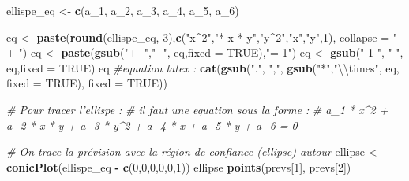 \documentclass[french]{article}
\newenvironment{Shaded}{\begin{snugshade}}{\end{snugshade}}
\newcommand{\CharTok}[1]{\textcolor[rgb]{0.31,0.60,0.02}{#1}}
\newcommand{\CommentTok}[1]{\textcolor[rgb]{0.56,0.35,0.01}{\textit{#1}}}
\newcommand{\DataTypeTok}[1]{\textcolor[rgb]{0.13,0.29,0.53}{#1}}
\newcommand{\DecValTok}[1]{\textcolor[rgb]{0.00,0.00,0.81}{#1}}
\newcommand{\KeywordTok}[1]{\textcolor[rgb]{0.13,0.29,0.53}{\textbf{#1}}}
\newcommand{\NormalTok}[1]{#1}
\newcommand{\OperatorTok}[1]{\textcolor[rgb]{0.81,0.36,0.00}{\textbf{#1}}}
\newcommand{\OtherTok}[1]{\textcolor[rgb]{0.56,0.35,0.01}{#1}}
\newcommand{\StringTok}[1]{\textcolor[rgb]{0.31,0.60,0.02}{#1}}
\begin{document}
\begin{Shaded}
\begin{Highlighting}[]
\NormalTok{ellispe_eq <-}\StringTok{ }\KeywordTok{c}\NormalTok{(a_}\DecValTok{1}\NormalTok{, a_}\DecValTok{2}\NormalTok{, a_}\DecValTok{3}\NormalTok{, a_}\DecValTok{4}\NormalTok{,}
\NormalTok{                a_}\DecValTok{5}\NormalTok{, a_}\DecValTok{6}\NormalTok{)}

\NormalTok{eq <-}\StringTok{ }\KeywordTok{paste}\NormalTok{(}\KeywordTok{round}\NormalTok{(ellispe_eq, }\DecValTok{3}\NormalTok{),}\KeywordTok{c}\NormalTok{(}\StringTok{"x^2"}\NormalTok{,}\StringTok{"* x * y"}\NormalTok{,}\StringTok{"y^2"}\NormalTok{,}\StringTok{"x"}\NormalTok{,}\StringTok{"y"}\NormalTok{,}\DecValTok{1}\NormalTok{),}
            \DataTypeTok{collapse =} \StringTok{" + "}\NormalTok{)}
\NormalTok{eq <-}\StringTok{ }\KeywordTok{paste}\NormalTok{(}\KeywordTok{gsub}\NormalTok{(}\StringTok{"+ -"}\NormalTok{,}\StringTok{"- "}\NormalTok{, eq,}\DataTypeTok{fixed =} \OtherTok{TRUE}\NormalTok{),}\StringTok{"= 1"}\NormalTok{)}
\NormalTok{eq <-}\StringTok{ }\KeywordTok{gsub}\NormalTok{(}\StringTok{" 1 "}\NormalTok{, }\StringTok{" "}\NormalTok{, eq,}\DataTypeTok{fixed =} \OtherTok{TRUE}\NormalTok{)}
\NormalTok{eq}
\CommentTok{#equation latex :}
\KeywordTok{cat}\NormalTok{(}\KeywordTok{gsub}\NormalTok{(}\StringTok{"."}\NormalTok{, }\StringTok{","}\NormalTok{,}
         \KeywordTok{gsub}\NormalTok{(}\StringTok{"*"}\NormalTok{,}\StringTok{"}\CharTok{\textbackslash{}\textbackslash{}}\StringTok{times"}\NormalTok{, eq, }\DataTypeTok{fixed =} \OtherTok{TRUE}\NormalTok{),}
         \DataTypeTok{fixed =} \OtherTok{TRUE}\NormalTok{))}

\CommentTok{# Pour tracer l'ellispe :}
\CommentTok{# il faut une equation sous la forme :}
\CommentTok{# a_1 * x^2 + a_2 * x * y + a_3 * y^2 + a_4 * x + a_5 * y + a_6 = 0}

\CommentTok{# On trace la prévision avec la région de confiance (ellipse) autour}
\NormalTok{ellipse <-}\StringTok{ }\KeywordTok{conicPlot}\NormalTok{(ellispe_eq }\OperatorTok{-}\StringTok{ }\KeywordTok{c}\NormalTok{(}\DecValTok{0}\NormalTok{,}\DecValTok{0}\NormalTok{,}\DecValTok{0}\NormalTok{,}\DecValTok{0}\NormalTok{,}\DecValTok{0}\NormalTok{,}\DecValTok{1}\NormalTok{))}
\NormalTok{ellipse}
\KeywordTok{points}\NormalTok{(prevs[}\DecValTok{1}\NormalTok{], prevs[}\DecValTok{2}\NormalTok{])}
\end{Highlighting}
\end{Shaded}
\end{document}
